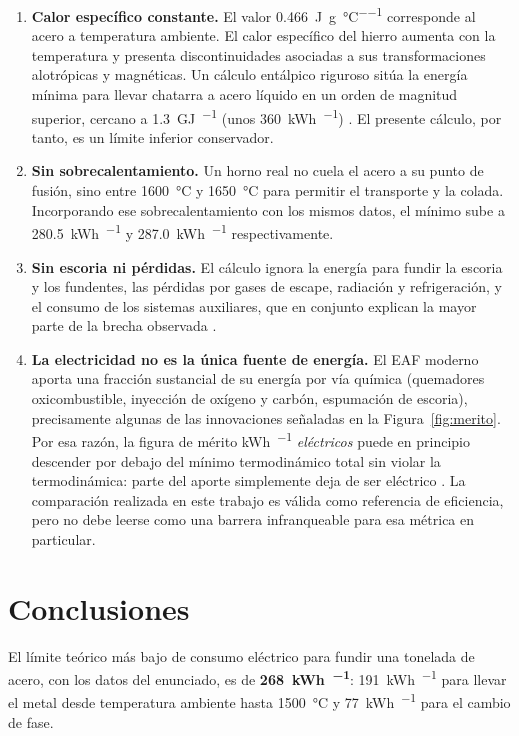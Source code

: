 \documentclass[11pt,letterpaper]{article}
\begin{document}
\begin{enumerate}
  \item \textbf{Calor específico constante.} El valor
    \SI{0.466}{\joule\per\gram\per\celsius} corresponde al acero a temperatura
    ambiente. El calor específico del hierro aumenta con la temperatura y
    presenta discontinuidades asociadas a sus transformaciones alotrópicas y
    magnéticas. Un cálculo entálpico riguroso sitúa la energía mínima para
    llevar chatarra a acero líquido en un orden de magnitud superior, cercano a
    \SI{1.3}{\giga\joule\per\ton} (unos \SI{360}{\kWh\per\ton})
    \parencite{fruehan2000}. El presente cálculo, por tanto, es un límite
    inferior conservador.
  \item \textbf{Sin sobrecalentamiento.} Un horno real no cuela el acero a su
    punto de fusión, sino entre \SI{1600}{\celsius} y \SI{1650}{\celsius} para
    permitir el transporte y la colada. Incorporando ese sobrecalentamiento con
    los mismos datos, el mínimo sube a \SI{280.5}{\kWh\per\ton} y
    \SI{287.0}{\kWh\per\ton} respectivamente.
  \item \textbf{Sin escoria ni pérdidas.} El cálculo ignora la energía para
    fundir la escoria y los fundentes, las pérdidas por gases de escape,
    radiación y refrigeración, y el consumo de los sistemas auxiliares, que en
    conjunto explican la mayor parte de la brecha observada
    \parencite{worrell2010}.
  \item \textbf{La electricidad no es la única fuente de energía.} El EAF
    moderno aporta una fracción sustancial de su energía por vía química
    (quemadores oxicombustible, inyección de oxígeno y carbón, espumación de
    escoria), precisamente algunas de las innovaciones señaladas en la
    Figura~\ref{fig:merito}. Por esa razón, la figura de mérito
    \si{\kWh\per\ton} \emph{eléctricos} puede en principio descender por debajo
    del mínimo termodinámico total sin violar la termodinámica: parte del
    aporte simplemente deja de ser eléctrico
    \parencite{madias2014,worldsteel2021}. La comparación realizada en este
    trabajo es válida como referencia de eficiencia, pero no debe leerse como
    una barrera infranqueable para esa métrica en particular.
\end{enumerate}

\section*{Conclusiones}

El límite teórico más bajo de consumo eléctrico para fundir una tonelada de
acero, con los datos del enunciado, es de \textbf{\SI{268}{\kWh\per\ton}}:
\SI{191}{\kWh\per\ton} para llevar el metal desde temperatura ambiente hasta
\SI{1500}{\celsius} y \SI{77}{\kWh\per\ton} para el cambio de fase.
\end{document}

